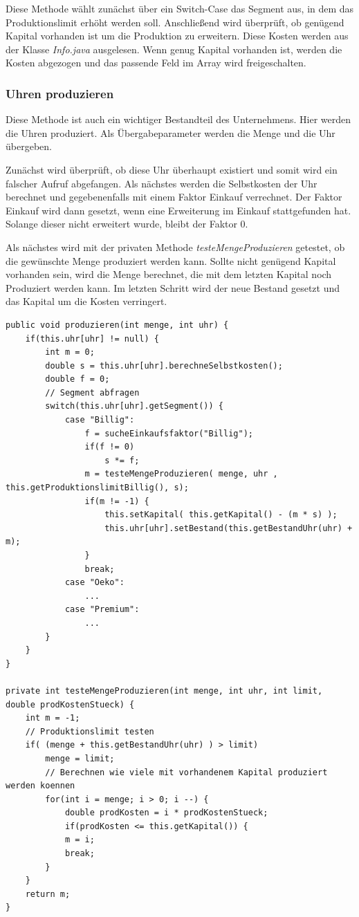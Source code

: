 Diese Methode wählt zunächst über ein Switch-Case das Segment aus, in dem das Produktionslimit erhöht werden soll. Anschließend wird überprüft, ob genügend Kapital vorhanden ist um die Produktion zu erweitern. Diese Kosten werden aus der Klasse \textit{Info.java} ausgelesen. Wenn genug Kapital vorhanden ist, werden die Kosten abgezogen und das passende Feld im Array wird freigeschalten.

\subsubsection{Uhren produzieren}
Diese Methode ist auch ein wichtiger Bestandteil des Unternehmens. Hier werden die Uhren produziert. Als Übergabeparameter werden die Menge und die Uhr übergeben. 

Zunächst wird überprüft, ob diese Uhr überhaupt existiert und somit wird ein falscher Aufruf abgefangen. Als nächstes werden die Selbstkosten der Uhr berechnet und gegebenenfalls mit einem Faktor Einkauf verrechnet. Der Faktor Einkauf wird dann gesetzt, wenn eine Erweiterung im Einkauf stattgefunden hat. Solange dieser nicht erweitert wurde, bleibt der Faktor 0.

Als nächstes wird mit der privaten Methode \textit{testeMengeProduzieren} getestet, ob die gewünschte Menge produziert werden kann. Sollte nicht genügend Kapital vorhanden sein, wird die Menge berechnet, die mit dem letzten Kapital noch Produziert werden kann. Im letzten Schritt wird der neue Bestand gesetzt und das Kapital um die Kosten verringert.

\begin{lstlisting}
public void produzieren(int menge, int uhr) {
	if(this.uhr[uhr] != null) {
		int m = 0;
		double s = this.uhr[uhr].berechneSelbstkosten();
		double f = 0;
		// Segment abfragen
		switch(this.uhr[uhr].getSegment()) {
			case "Billig":
				f = sucheEinkaufsfaktor("Billig");
				if(f != 0)
					s *= f;
				m = testeMengeProduzieren( menge, uhr , this.getProduktionslimitBillig(), s);
				if(m != -1) {
					this.setKapital( this.getKapital() - (m * s) );
					this.uhr[uhr].setBestand(this.getBestandUhr(uhr) + m);
				}
				break;
			case "Oeko":
				...
			case "Premium":
				...
		}
	}
}

private int testeMengeProduzieren(int menge, int uhr, int limit, double prodKostenStueck) {
	int m = -1;
	// Produktionslimit testen
	if( (menge + this.getBestandUhr(uhr) ) > limit)
		menge = limit;
		// Berechnen wie viele mit vorhandenem Kapital produziert werden koennen
		for(int i = menge; i > 0; i --) {
			double prodKosten = i * prodKostenStueck;
			if(prodKosten <= this.getKapital()) {
			m = i;
			break;
		}
	}
	return m;
}
\end{lstlisting}

